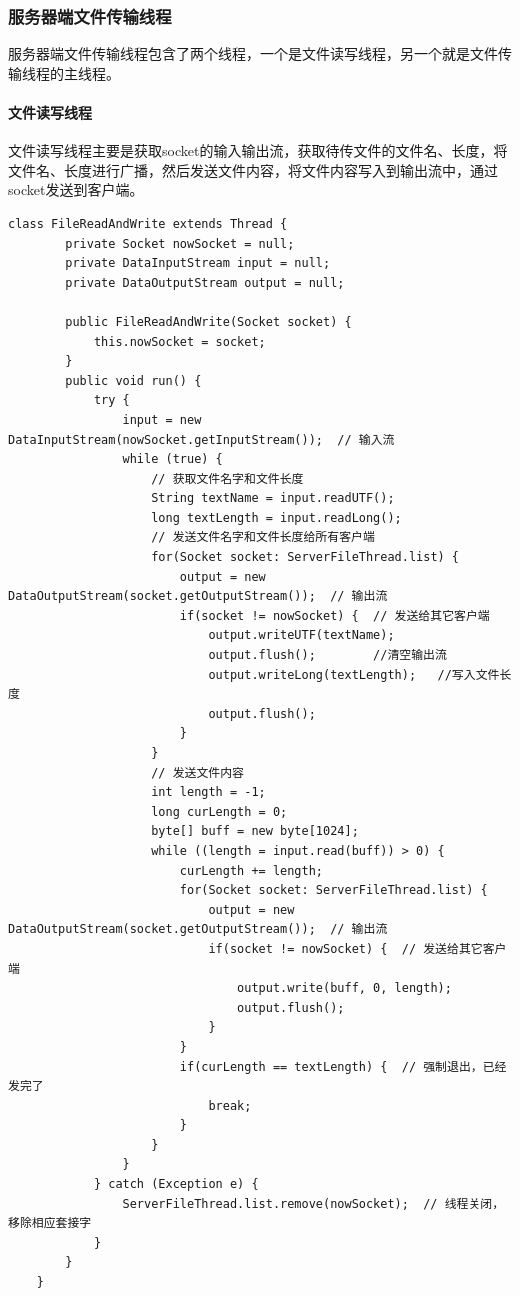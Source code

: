 \documentclass[UTF8,12pt]{article}
\begin{document}
\subsubsection{服务器端文件传输线程}
服务器端文件传输线程包含了两个线程，一个是文件读写线程，另一个就是文件传输线程的主线程。

\paragraph{文件读写线程}
文件读写线程主要是获取socket的输入输出流，获取待传文件的文件名、长度，将文件名、长度进行广播，然后发送文件内容，将文件内容写入到输出流中，通过socket发送到客户端。

\begin{lstlisting}[title=文件读写线程,frame=shadowbox]
    class FileReadAndWrite extends Thread {
        private Socket nowSocket = null;
        private DataInputStream input = null;
        private DataOutputStream output = null;
    
        public FileReadAndWrite(Socket socket) {
            this.nowSocket = socket;
        }
        public void run() {
            try {
                input = new DataInputStream(nowSocket.getInputStream());  // 输入流
                while (true) {
                    // 获取文件名字和文件长度
                    String textName = input.readUTF();
                    long textLength = input.readLong();
                    // 发送文件名字和文件长度给所有客户端
                    for(Socket socket: ServerFileThread.list) {
                        output = new DataOutputStream(socket.getOutputStream());  // 输出流
                        if(socket != nowSocket) {  // 发送给其它客户端
                            output.writeUTF(textName);
                            output.flush();		   //清空输出流
                            output.writeLong(textLength);	//写入文件长度
                            output.flush();
                        }
                    }
                    // 发送文件内容
                    int length = -1;
                    long curLength = 0;
                    byte[] buff = new byte[1024];
                    while ((length = input.read(buff)) > 0) {
                        curLength += length;
                        for(Socket socket: ServerFileThread.list) {
                            output = new DataOutputStream(socket.getOutputStream());  // 输出流
                            if(socket != nowSocket) {  // 发送给其它客户端
                                output.write(buff, 0, length);
                                output.flush();
                            }
                        }
                        if(curLength == textLength) {  // 强制退出，已经发完了
                            break;
                        }
                    }
                }
            } catch (Exception e) {
                ServerFileThread.list.remove(nowSocket);  // 线程关闭，移除相应套接字
            }
        }
    }
\end{lstlisting}
\end{document}
